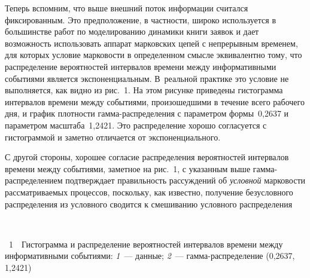 \begin{multicols}{2}
Теперь вспомним, что выше внешний поток информации считался
фиксированным. Это предположение, в частности, широко используется в
большинстве работ по моделированию динамики книги заявок и дает
возможность использовать аппарат марковских цепей с непрерывным
временем, для которых условие марковости в определенном смысле
эквивалентно тому, что распределение вероятностей интервалов времени
между информативными событиями является экспоненциальным. В~реальной
практике это условие не выполняется, как видно из рис.~1. 
На этом рисунке приведены гистограмма
интервалов времени между событиями, произошедшими в течение всего
рабочего дня, и график плот\-ности гам\-ма-рас\-пре\-де\-ле\-ния с па\-ра\-мет\-ром
формы~0,2637 и па\-ра\-мет\-ром мас\-шта\-ба~1,2421. Это распределение хорошо
согласуется с гистограммой и заметно отличается от
экспоненциального.



С другой стороны, хорошее согласие распределения вероятностей
интервалов времени между событиями, заметное на рис.~1, 
с указанным выше гам\-ма-рас\-пре\-де\-ле\-ни\-ем
подтверждает правильность рассуждений об {\it условной} марковости
рассматриваемых процессов, поскольку, как известно, получение
безусловного распределения из условного сводится к смешиванию
условного распределения\linebreak\vspace*{-12pt}

\begin{center}  %


\vspace*{1pt}

\mbox{%
 \epsfxsize=72.282mm
 }
 \end{center}
{{\figurename~1}\ \ \small{Гистограмма и распределение вероятностей интервалов времени 
  между информативными событиями: \textit{1}~--- данные; \textit{2}~--- 
  гамма-распределение (0,2637, 1,2421)}}




\vspace*{12pt}

\addtocounter{figure}{1}



\end{multicols}
